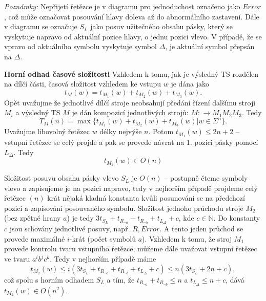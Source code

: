 \documentclass[a4paper,12pt]{article}
\begin{document}
\begin{enumerate}[label=\textbf{\arabic*}.]
\begin{center}
      \end{center}
     \emph{Poznámky:} Nepřijetí řetězce je v diagramu pro jednoduchost označeno jako $Error$, což může označovat posouvání
     hlavy doleva až do abnormálního zastavení. Dále v diagramu se označuje $S_L$ jako posuv užitečného obsahu pásky, který se 
     vyskytuje napravo od aktuální pozice hlavy, o jednu pozici vlevo. V případě, že se vpravo od aktuálního symbolu vyskytuje
     symbol $\Delta$, je aktuální symbol přepsán na $\Delta$.
     
     {\bfseries Horní odhad časové složitosti}
     Vzhledem k tomu, jak je výsledný TS rozdělen na dílčí části, časová složitost vzhledem ke vstupu $w$ je dána jako
     $$t_M(w) = t_{M_1}(w) + t_{M_2}(w) + t_{M_3}(w).$$
     Opět uvažujme že jednotlivé dílčí stroje neobsahují předání řízení dalšímu stroji $M_i$ a výsledný TS $M$ je dán
     kompozicí jednotlivých strojů: $M: \rightarrow M_1M_2M_3$. Tedy 
     $$
      T_M(n) = \max\{t_{M_1}(w) + t_{M_2}(w) + t_{M_3}(w) | w\in\Sigma^n\}.
     $$
     Uvažujme libovolný řetězec $w$ délky nejvýše $n$. Potom $t_{M_1}(w) \leq 2n + 2$ -- vstupní řetězec se celý projde
     a pak se provede návrat na 1. pozici pásky pomocí $L_\Delta$. Tedy $$t_{M_1}(w) \in O(n)$$
     
     Složitost posuvu obsahu pásky vlevo $S_L$ je $O(n)$ -- postupně
     čteme symboly vlevo a zapisujeme je na pozici napravo, tedy v nejhorším případě projdeme celý řetězec $(n)$ krát nějaká kladná
     konstanta kvůli posunování se na předchozí pozici a zapisování posouvaného symbolu. Složitost jednoho průchodu stroje $M_2$ 
     (bez zpětné hrany $a$) je tedy $3t_{S_L} + t_{R_{\neg a}} + t_{R_{\neg b}} + t_{L_\Delta} + c$, kde $c\in\mathbb{N}$. Do konstanty
     $c$ jsou schovány jednotlivé posuvy, např. $R,Error$. A tento jeden průchod se provede maximálné $i$-krát (počet symbolů $a$). Vzhledem
     k tomu, že stroj $M_1$ provede kontrolu tvaru vstupního řetězce, můžeme dále uvažovat vstupní řetězec ve tvaru $a^ib^jc^k$. Tedy
     v nejhorším případě máme 
     $$
      t_{M_2}(w) \leq i(3t_{S_L} + t_{R_{\neg a}} + t_{R_{\neg b}} + t_{L_\Delta} + c) \leq n(3t_{S_L} + 2n + c),
     $$
     což spolu s horním odhadem $S_L$ a tím, že $t_{R_{\neg a}} + t_{R_{\neg b}} \leq n$ a $t_{L_\Delta} \leq n + c$, 
     dává $t_{M_2}(w) \in O(n^2)$.
     

\end{enumerate}
\end{document}
